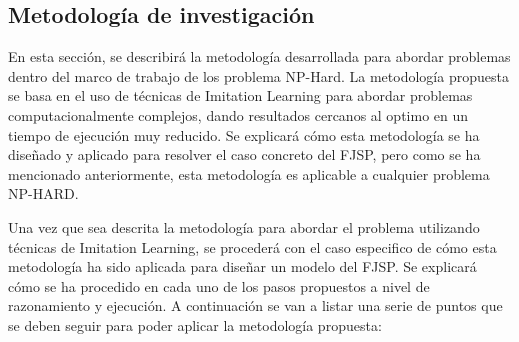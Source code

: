 \subsection{Metodología de investigación}
En esta sección, se describirá la metodología desarrollada para abordar problemas 
dentro del marco de trabajo de los problema NP-Hard. La metodología propuesta se 
basa en el uso de técnicas de Imitation Learning para abordar problemas computacionalmente
complejos, dando resultados cercanos al optimo en un tiempo de ejecución muy reducido. 
Se explicará cómo esta metodología se ha diseñado y aplicado para resolver el caso concreto 
del FJSP, pero como se ha mencionado anteriormente, esta metodología es aplicable a cualquier
problema NP-HARD.\medskip

Una vez que sea descrita la metodología para abordar el problema utilizando 
técnicas de Imitation Learning, se procederá con el caso especifico de cómo esta metodología 
ha sido aplicada para diseñar un modelo del FJSP. Se explicará cómo se ha procedido en cada uno 
de los pasos propuestos a nivel de razonamiento y ejecución. A continuación se van a listar una 
serie de puntos que se deben seguir para poder aplicar la metodología propuesta:

